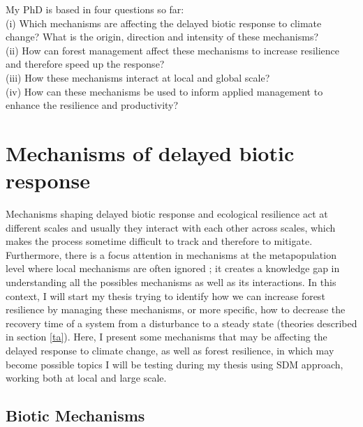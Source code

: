 My PhD is based in four questions so far: \\
(i) Which mechanisms are affecting the delayed biotic response to climate change? What is the origin, direction and intensity of these mechanisms? \\
(ii) How can forest management affect these mechanisms to increase resilience and therefore speed up the response? \\
(iii) How these mechanisms interact at local and global scale? \\
(iv) How can these mechanisms be used to inform applied management to enhance the resilience and productivity?

\section{Mechanisms of delayed biotic response}

Mechanisms shaping delayed biotic response and ecological resilience act at different scales and usually they interact with each other across scales, which makes the process sometime difficult to track and therefore to mitigate.
Furthermore, there is a focus attention in mechanisms at the metapopulation level where local mechanisms are often ignored \citep{Hylander2013}; it creates a knowledge gap in understanding all the possibles mechanisms as well as its interactions.
In this context, I will start my thesis trying to identify how we can increase forest resilience by managing these mechanisms, or more specific, how to decrease the recovery time of a system from a disturbance to a steady state (theories described in section \ref{ta}).
Here, I present some mechanisms that may be affecting the delayed response to climate change, as well as forest resilience, in which may become possible topics I will be testing during my thesis using SDM approach, working both at local and large scale.

\subsection{Biotic Mechanisms}

